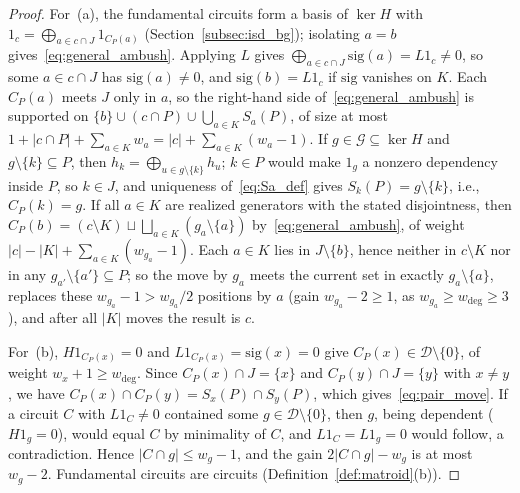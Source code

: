 \documentclass[12pt]{article}
\theoremstyle{definition}
\newcommand{\Dc}{\mathcal{D}}
\newcommand{\Gc}{\mathcal{G}}
\begin{document}
\begin{proof}
For~(a), the fundamental circuits form a basis of $\ker H$ with $1_c = \bigoplus_{a \in c \cap J} 1_{C_P(a)}$
(Section~\ref{subsec:isd_bg}); isolating $a = b$ gives~\eqref{eq:general_ambush}. Applying $L$ gives $\bigoplus_{a
\in c \cap J} \mathrm{sig}(a) = L 1_c \neq 0$, so some $a \in c \cap J$ has $\mathrm{sig}(a) \neq 0$, and
$\mathrm{sig}(b) = L 1_c$ if $\mathrm{sig}$ vanishes on $K$. Each $C_P(a)$ meets $J$ only in $a$, so the right-hand
side of~\eqref{eq:general_ambush} is supported on $\{b\} \cup (c \cap P) \cup \bigcup_{a \in K} S_a(P)$, of size at
most $1 + |c \cap P| + \sum_{a \in K} w_a = |c| + \sum_{a \in K} (w_a - 1)$. If $g \in \Gc \subseteq \ker H$ and
$g \setminus \{k\} \subseteq P$, then $h_k = \bigoplus_{u \in g \setminus \{k\}} h_u$; $k \in P$ would make $1_g$ a
nonzero dependency inside $P$, so $k \in J$, and uniqueness of~\eqref{eq:Sa_def} gives $S_k(P) = g \setminus \{k\}$,
i.e., $C_P(k) = g$. If all $a \in K$ are realized generators with the stated disjointness, then $C_P(b) = (c \setminus
K) \sqcup \bigsqcup_{a \in K} (g_a \setminus \{a\})$ by~\eqref{eq:general_ambush}, of weight $|c| - |K| + \sum_{a \in
K} (w_{g_a} - 1)$. Each $a \in K$ lies in $J \setminus \{b\}$, hence neither in $c \setminus K$ nor in any $g_{a'}
\setminus \{a'\} \subseteq P$; so the move by $g_a$ meets the current set in exactly $g_a \setminus \{a\}$, replaces
these $w_{g_a} - 1 > w_{g_a}/2$ positions by $a$ (gain $w_{g_a} - 2 \ge 1$, as $w_{g_a} \ge w_{\deg} \ge 3$), and after
all $|K|$ moves the result is $c$.

For~(b), $H 1_{C_P(x)} = 0$ and $L 1_{C_P(x)} = \mathrm{sig}(x) = 0$ give $C_P(x) \in \Dc \setminus \{0\}$, of weight
$w_x + 1 \ge w_{\deg}$. Since $C_P(x) \cap J = \{x\}$ and $C_P(y) \cap J = \{y\}$ with $x \neq y$, we have $C_P(x)
\cap C_P(y) = S_x(P) \cap S_y(P)$, which gives~\eqref{eq:pair_move}. If a circuit $C$ with $L 1_C \neq 0$ contained
some $g \in \Dc \setminus \{0\}$, then $g$, being dependent ($H 1_g = 0$), would equal $C$ by minimality of $C$, and
$L 1_C = L 1_g = 0$ would follow, a contradiction. Hence $|C \cap g| \le w_g - 1$, and the gain $2|C \cap g| - w_g$
is at most $w_g - 2$. Fundamental circuits are circuits (Definition~\ref{def:matroid}(b)).


\end{proof}
\end{document}
